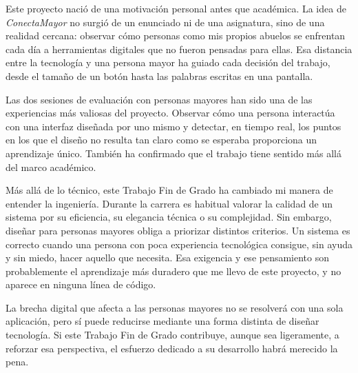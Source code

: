 Este proyecto nació de una motivación personal antes que académica. La
idea de \emph{ConectaMayor} no surgió de un enunciado ni de una
asignatura, sino de una realidad cercana: observar cómo personas como
mis propios abuelos se enfrentan cada día a herramientas digitales que
no fueron pensadas para ellas. Esa distancia entre la tecnología y una persona mayor ha guiado cada
decisión del trabajo, desde el tamaño de un botón hasta las palabras
escritas en una pantalla.

Las dos sesiones de evaluación con personas mayores han sido una de las
experiencias más valiosas del proyecto. Observar cómo una persona
interactúa con una interfaz diseñada por uno mismo y detectar, en
tiempo real, los puntos en los que el diseño no resulta tan claro como
se esperaba proporciona un aprendizaje único. También ha
confirmado que el trabajo tiene sentido más allá del marco académico.

Más allá de lo técnico, este Trabajo Fin de Grado ha cambiado mi manera
de entender la ingeniería. Durante la carrera es habitual valorar la
calidad de un sistema por su eficiencia, su elegancia técnica o su
complejidad. Sin embargo, diseñar para personas mayores obliga a priorizar distintos criterios. Un sistema es correcto cuando una persona con poca
experiencia tecnológica consigue, sin ayuda y sin miedo, hacer aquello
que necesita. Esa exigencia y ese pensamiento son probablemente el aprendizaje más
duradero que me llevo de este proyecto, y no aparece en ninguna línea de
código.

La brecha digital que afecta a las personas mayores no se resolverá con
una sola aplicación, pero sí puede reducirse mediante una forma distinta
de diseñar tecnología. Si este Trabajo Fin de Grado contribuye, aunque sea
ligeramente, a reforzar esa perspectiva, el esfuerzo dedicado a su
desarrollo habrá merecido la pena.
